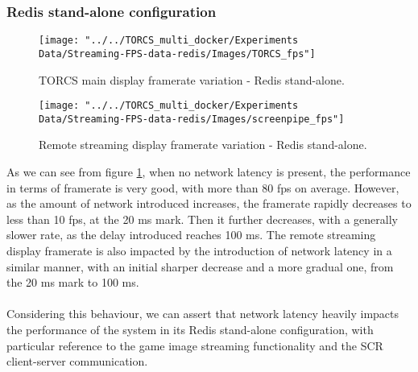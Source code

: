 \subsubsection{Redis stand-alone configuration}
\begin{figure}[h!]
	\centering
	\texttt{[image: "../../TORCS\_multi\_docker/Experiments Data/Streaming-FPS-data-redis/Images/TORCS\_fps"]}
	\caption[TORCS main display framerate variation - Redis stand-alone]{TORCS main display framerate variation - Redis stand-alone.}
	\label{fig:torcs-merged-fps-redis}
\end{figure}
\begin{figure}[h!]
	\centering
	\texttt{[image: "../../TORCS\_multi\_docker/Experiments Data/Streaming-FPS-data-redis/Images/screenpipe\_fps"]}
	\caption[Remote streaming display framerate variation - Redis stand-alone]{Remote streaming display framerate variation - Redis stand-alone.}
	\label{fig:screenpipe-merged-fps-redis}
\end{figure}
As we can see from figure \ref{fig:torcs-merged-fps-redis}, when no network latency is present, the performance in terms of framerate is very good, with more than 80 fps on average. However, as the amount of network introduced increases, the framerate rapidly decreases to less than 10 fps, at the 20 ms mark. Then it further decreases, with a generally slower rate, as the delay introduced reaches 100 ms. The remote streaming display framerate is also impacted by the introduction of network latency in a similar manner, with an initial sharper decrease and a more gradual one, from the 20 ms mark to 100 ms. \\ \\
Considering this behaviour, we can assert that network latency heavily impacts the performance of the system in its Redis stand-alone configuration, with particular reference to the game image streaming functionality and the SCR client-server communication.

